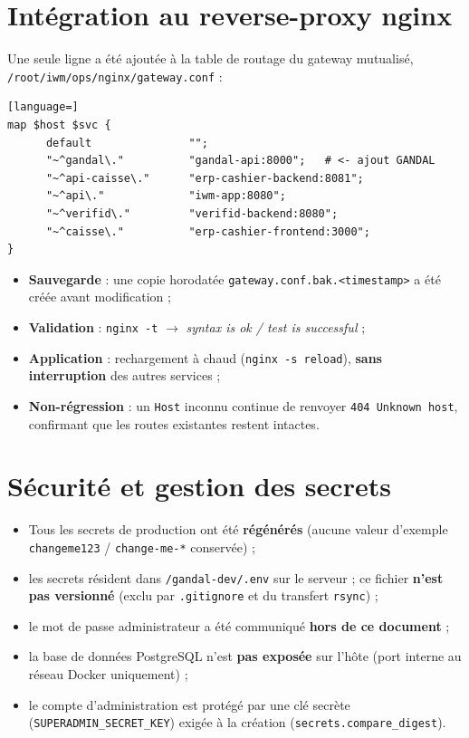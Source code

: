 \documentclass[11pt,a4paper]{article}
\newcommand{\code}[1]{\texttt{\small #1}}
\begin{document}
\section{Intégration au reverse-proxy nginx}

Une seule ligne a été ajoutée à la table de routage du gateway mutualisé,
\code{/root/iwm/ops/nginx/gateway.conf} :

\begin{lstlisting}[language=]
map $host $svc {
      default               "";
      "~^gandal\."          "gandal-api:8000";   # <- ajout GANDAL
      "~^api-caisse\."      "erp-cashier-backend:8081";
      "~^api\."             "iwm-app:8080";
      "~^verifid\."         "verifid-backend:8080";
      "~^caisse\."          "erp-cashier-frontend:3000";
}
\end{lstlisting}

\begin{itemize}
  \item \textbf{Sauvegarde} : une copie horodatée \code{gateway.conf.bak.<timestamp>} a
        été créée avant modification ;
  \item \textbf{Validation} : \code{nginx -t} $\rightarrow$ \emph{syntax is ok / test is
        successful} ;
  \item \textbf{Application} : rechargement à chaud (\code{nginx -s reload}), \textbf{sans
        interruption} des autres services ;
  \item \textbf{Non-régression} : un \code{Host} inconnu continue de renvoyer
        \code{404 Unknown host}, confirmant que les routes existantes restent intactes.
\end{itemize}

\section{Sécurité et gestion des secrets}

\begin{itemize}
  \item Tous les secrets de production ont été \textbf{régénérés} (aucune valeur
        d'exemple \code{changeme123} / \code{change-me-*} conservée) ;
  \item les secrets résident dans \code{/gandal-dev/.env} sur le serveur ; ce fichier
        \textbf{n'est pas versionné} (exclu par \code{.gitignore} et du transfert
        \code{rsync}) ;
  \item le mot de passe administrateur a été communiqué \textbf{hors de ce document} ;
  \item la base de données PostgreSQL n'est \textbf{pas exposée} sur l'hôte (port interne
        au réseau Docker uniquement) ;
  \item le compte d'administration est protégé par une clé secrète
        (\code{SUPERADMIN\_SECRET\_KEY}) exigée à la création
        (\code{secrets.compare\_digest}).
\end{itemize}
\end{document}

